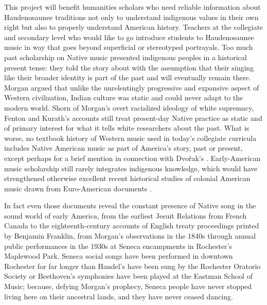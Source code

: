 \documentclass{neh}
\begin{document}
This project will benefit humanities scholars who need reliable information
about Haudenosaunee traditions not only to understand indigenous values in
their own right but also to properly understand American history.
Teachers at the collegiate and secondary level who would like to go introduce
students to Haudenosaunee music in way that goes beyond superficial or
stereotyped portrayals.
Too much past scholarship on Native music presented indigenous peoples in a
historical present tense: they told the story about 
with the assumption that their singing like their broader identity is part
of the past and will eventually remain there.
Morgan argued that unlike the unrelentingly progressive and expansive aspect
of Western civilization, Indian culture was static and could never adapt to
the modern world. 
Shorn of Morgan's overt racialized ideology of white supremacy, Fenton and
Kurath's accounts still treat present-day Native practice as static and of
primary interest for what it tells white researchers about the past.
What is worse, no textbook history of Western music used in today's collegiate
curricula includes Native American music as part of America's story, past or
present, except perhaps for a brief mention in connection with Dvo\v{r}ak's
.
Early-American music scholarship still rarely integrates indigenous knowledge,
which would have strengthened otherwise excellent recent historical studies of
colonial American music drawn from Euro-American documents
\Autocites{Goodman:IndianPsalmody}{Eyerly:Moravian}.

In fact even those documents reveal the constant presence of Native song in
the sound world of early America, from the earliest Jesuit Relations from
French Canada to the eighteenth-century accounts of English treaty proceedings
printed by Benjamin Franklin, from Morgan's observations in the 1840s through
annual public performances in the 1930s at Seneca encampments in Rochester's
Maplewood Park.
Seneca social songs have been performed in downtown Rochester for far longer
than Handel's  have been sung by the Rochester Oratorio
Society or Beethoven's symphonies have been played at the Eastman School of
Music; because, defying Morgan's prophecy, Seneca people have never stopped
living here on their ancestral lands, and they have never ceased dancing.
\end{document}
